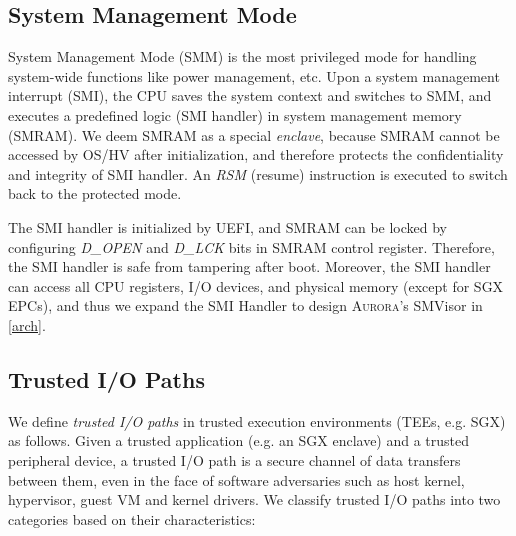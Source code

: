 \documentclass[journal,twocolumn,letterpaper,10pt]{IEEEtran}
\begin{document}
\subsection{System Management Mode}
System Management Mode (SMM) \cite{Corporation2016Intel} is the most privileged mode for handling system-wide functions like power management, etc. Upon a system management interrupt (SMI), the CPU saves the system context and switches to SMM, and executes a predefined logic (SMI handler) in system management memory (SMRAM). We deem SMRAM as a special \textit{enclave}, because SMRAM cannot be accessed by OS/HV after initialization, and therefore protects the confidentiality and integrity of SMI handler. An \textit{RSM} (resume) instruction is executed to switch back to the protected mode.

The SMI handler is initialized by UEFI, and  SMRAM can be locked by configuring \emph{D\_OPEN} and \emph{D\_LCK} bits in SMRAM control register. Therefore, the SMI handler is safe from tampering after boot. Moreover, the SMI handler can access all CPU registers, I/O devices, and physical memory (except for SGX EPCs), and thus we expand the SMI Handler to design \textsc{Aurora}'s SMVisor in \autoref{arch}.

\subsection{Trusted I/O Paths}\label{types}

We define \emph{trusted I/O paths} in trusted execution environments (TEEs, e.g. SGX) as follows. Given a trusted application (e.g. an SGX enclave) and a trusted peripheral device, a trusted I/O path is a secure channel of data transfers between them, even in the face of software adversaries such as host kernel, hypervisor, guest VM and kernel drivers. We classify trusted I/O paths into two categories based on their characteristics:
\end{document}
